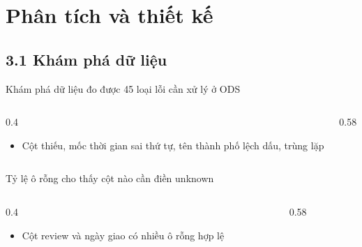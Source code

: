 \section[Phân tích và thiết kế]{Phân tích và thiết kế}

\subsection{3.1 Khám phá dữ liệu}

\begin{frame}{Khám phá dữ liệu đo được 45 loại lỗi cần xử lý ở ODS}
\begin{columns}[T]\begin{column}{0.4\textwidth}
\begin{itemize}
  \item Cột thiếu, mốc thời gian sai thứ tự, tên thành phố lệch dấu, trùng lặp
\end{itemize}
\end{column}\begin{column}{0.58\textwidth}
\begin{center}\end{center}
\end{column}\end{columns}

\end{frame}

\begin{frame}{Tỷ lệ ô rỗng cho thấy cột nào cần điền unknown}
\begin{columns}[T]\begin{column}{0.4\textwidth}
\begin{itemize}
  \item Cột review và ngày giao có nhiều ô rỗng hợp lệ
\end{itemize}
\end{column}\begin{column}{0.58\textwidth}
\begin{center}\end{center}
\end{column}\end{columns}

\end{frame}

